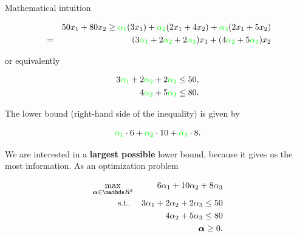 \begin{vbframe}{Mathematical intuition}
%

\vspace*{-0.5cm}

\begin{eqnarray*}
&& 50x_1 + 80x_2 \ge \textcolor{green}{\alpha_1} (3x_1) + \textcolor{green}{\alpha_2} (2x_1 + 4x_2) + \textcolor{green}{\alpha_3} (2x_1 + 5x_2) \\ &=& (3 \textcolor{green}{\alpha_1} + 2  \textcolor{green}{\alpha_2} + 2 \textcolor{green}{\alpha_3}) x_1 + (4  \textcolor{green}{\alpha_2} + 5 \textcolor{green}{\alpha_3}) x_2
\end{eqnarray*}

or equivalently

\vspace*{-0.5cm}
\begin{eqnarray*}
3 \textcolor{green}{\alpha_1} + 2  \textcolor{green}{\alpha_2} + 2 \textcolor{green}{\alpha_3} \le 50, \\
4  \textcolor{green}{\alpha_2} + 5 \textcolor{green}{\alpha_3} \le 80.
\end{eqnarray*}

The lower bound (right-hand side of the inequality) is given by

$$
\textcolor{green}{\alpha_1} \cdot 6 + \textcolor{green}{\alpha_2} \cdot 10 + \textcolor{green}{\alpha_3} \cdot 8.
$$

\framebreak

We are interested in a \textbf{largest possible} lower bound, because it gives us the most information. As an optimization problem

\begin{eqnarray*}
\max_{\bm{\alpha} \in \R^3} && 6 \alpha_1 + 10 \alpha_2 + 8 \alpha_3 \\
\text{s.t. } && 3\alpha_1 + 2\alpha_2 + 2\alpha_3 \le 50 \\
&& 4\alpha_2 + 5\alpha_3 \le 80\\
&& \bm{\alpha} \ge 0.
\end{eqnarray*}


\end{vbframe}



